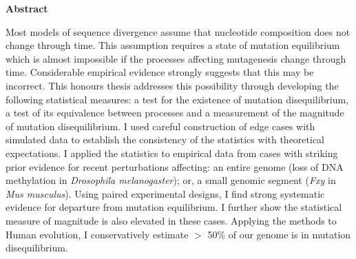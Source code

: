 \thispagestyle{plain}
\begin{center}
    
    \textbf{Abstract}
    
    Most models of sequence divergence assume that nucleotide composition does not change through time. This assumption requires a state of mutation equilibrium which is almost impossible if the processes affecting mutagenesis change through time. Considerable empirical evidence strongly suggests that this may be incorrect. This honours thesis addresses this possibility through developing the following statistical measures: a test for the existence of mutation disequilibrium, a test of its equivalence between processes and a measurement of the magnitude of mutation disequilibrium. I used careful construction of edge cases with simulated data to establish the consistency of the statistics with theoretical expectations. I applied the statistics to empirical data from cases with striking prior evidence for recent perturbations affecting: an entire genome (loss of DNA methylation in \textit{Drosophila melanogaster}); or, a small genomic segment (\textit{Fxy} in \textit{Mus musculus}). Using paired experimental designs, I find strong systematic evidence for departure from mutation equilibrium. I further show the statistical measure of magnitude is also elevated in these cases. Applying the methods to Human evolution, I conservatively estimate $>$ 50\% of our genome is in mutation disequilibrium. 


\end{center}